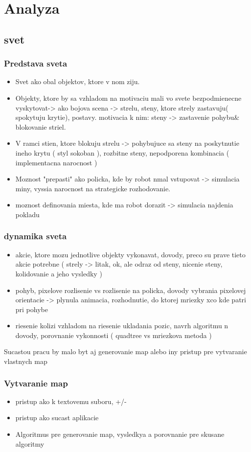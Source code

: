 \documentclass[12pt,notitlepage]{report}
\begin{document}
\chapter{Analyza}
\section{svet}
\subsection{Predstava sveta}
\begin{itemize}
\item Svet ako obal objektov, ktore v nom ziju. 
\item Objekty, ktore by sa vzhladom na motivaciu mali vo svete bezpodmienecne vyskytovat-> ako bojova scena -> strelu, steny, ktore strely zastavuju( spokytuju krytie), postavy. motivacia k nim: steny -> zastavenie pohybu\& blokovanie striel. 
\item V ramci stien, ktore blokuju strelu -> pohybujuce sa steny na poskytnutie ineho krytu ( styl sokoban ), rozbitne steny, nepodporena kombinacia ( implementacna narocnost )
\item Moznost "prepasti" ako policka, kde by robot nmal vstupovat -> simulacia miny, vyssia narocnost na strategicke rozhodovanie.
\item moznost definovania miesta, kde ma robot dorazit -> simulacia najdenia pokladu
\end{itemize}
\subsection{dynamika sveta}
\begin{itemize}
\item akcie, ktore mozu jednotlive objekty vykonavat, dovody, preco su prave tieto akcie potrebne ( strely -> litak, ok, ale odraz od steny, nicenie steny, kolidovanie a jeho vysledky )
\item pohyb, pixelove rozlisenie vs rozlisenie na policka,  dovody vybrania pixelovej orientacie -> plynula animacia, rozhodnutie, do ktorej mriezky xco kde patri pri pohybe
\item riesenie kolizi vzhladom na riesenie ukladania pozic, navrh algoritmu n dovody, porovnanie vykonnosti ( quadtree vs mriezkova metoda )
\end{itemize}
Sucastou pracu by malo byt aj generovanie map alebo iny pristup pre vytvaranie vlastnych map
\subsection{Vytvaranie map}
\begin{itemize}
\item pristup ako k textovemu suboru, +/-
\item pristup ako sucast aplikacie
\item Algoritmus pre generovanie map, vysledkya a porovnanie pre skusane algoritmy
\end{itemize}
\end{document}
